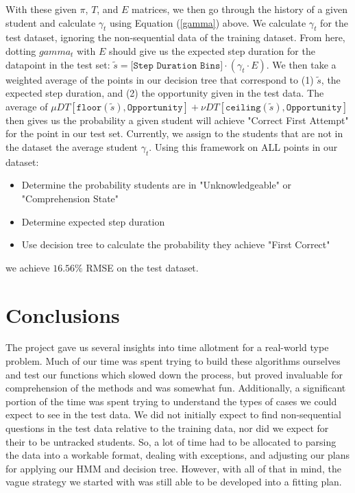 \documentclass{article} %
\begin{document}
With these given $\pi$, $T$, and $E$ matrices, we then go through the history of a given student and calculate $\gamma_t$ using Equation (\ref{gamma}) above. We calculate $\gamma_t$ for the test dataset, ignoring the non-sequential data of the training dataset. From here, dotting $gamma_t$ with $E$ should give us the expected step duration for the datapoint in the test set: $\tilde{s} = \texttt{[Step Duration Bins]} \cdot (\gamma_t \cdot E)$. We then take a weighted average of the points in our decision tree that correspond to (1) $\tilde{s}$, the expected step duration, and (2) the opportunity given in the test data. The average of $\mu DT[\texttt{floor}(\tilde{s}),\texttt{Opportunity}] + \nu DT[\texttt{ceiling}(\tilde{s}),\texttt{Opportunity}]$ then gives us the probability a given student will achieve "Correct First Attempt" for the point in our test set. Currently, we assign to the students that are not in the dataset the average student $\gamma_t$. Using this framework on ALL points in our dataset:
\begin{itemize}
\item Determine the probability students are in "Unknowledgeable" or "Comprehension State"
\item Determine expected step duration
\item Use decision tree to calculate the probability they achieve "First Correct"
\end{itemize}
we achieve $16.56\%$ RMSE on the test dataset.

\section{Conclusions}

The project gave us several insights into time allotment for a real-world type problem. Much of our time was spent trying to build these algorithms ourselves and test our functions which slowed down the process, but proved invaluable for comprehension of the methods and was somewhat fun. Additionally, a significant portion of the time was spent trying to understand the types of cases we could expect to see in the test data. We did not initially expect to find non-sequential questions in the test data relative to the training data, nor did we expect for their to be untracked students. So, a lot of time had to be allocated to parsing the data into a workable format, dealing with exceptions, and adjusting our plans for applying our HMM and decision tree. However, with all of that in mind, the vague strategy we started with was still able to be developed into a fitting plan.
\end{document}
